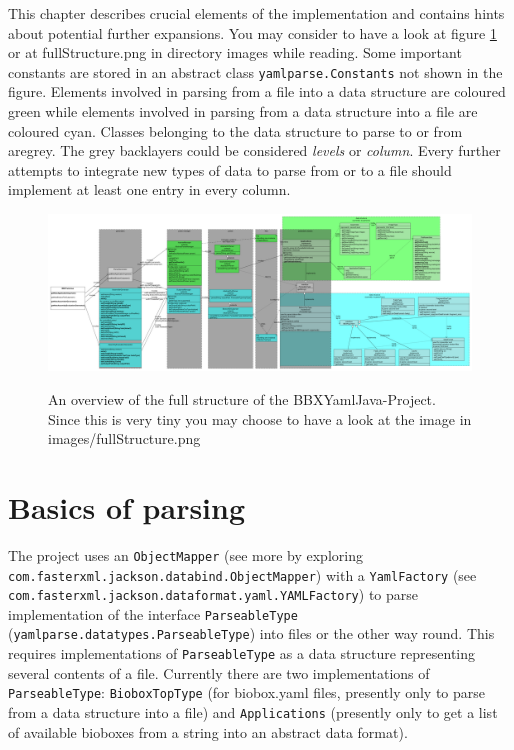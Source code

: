 \documentclass[
	twoside,
	fontsize=12pt,
	headsepline,
	cleardoublepage=empty,
	numbers=noenddot,
	bibliography=totoc,
]{scrbook}
\newcommand{\code}[1]{\texttt{#1}}
\begin{document}
This chapter describes crucial elements of the implementation and contains hints about potential further expansions. You may consider to have a look at figure \ref{fig:fullStructure} or at fullStructure.png in directory images while reading. Some important constants are stored in an abstract class \code{yamlparse.Constants} not shown in the figure. Elements involved in parsing from a file into a data structure are coloured green while elements involved in parsing from a data structure into a file are coloured cyan. Classes belonging to the data structure to parse to or from aregrey. The grey backlayers could be considered \emph{levels} or \emph{column}. Every further attempts to integrate new types of data to parse from or to a file should implement at least one entry in every column. 

\begin{figure}[h]
	\includegraphics[scale=0.18, angle=90]{images/fullStructure.png}
	\label{fig:fullStructure}
	\caption{An overview of the full structure of the BBXYamlJava-Project. Since this is very tiny you may choose to have a look at the image in images/fullStructure.png}
\end{figure}

\section{Basics of parsing}
\label{sec:basicParsing}
The project uses an \code{ObjectMapper} (see more by exploring\\ \code{com.fasterxml.jackson.databind.ObjectMapper}) with a \code{YamlFactory} (see  \code{com.fasterxml.jackson.dataformat.yaml.YAMLFactory}) to parse implementation of the interface \code{ParseableType} (\code{yamlparse.datatypes.ParseableType}) into files or the other way round. This requires implementations of \code{ParseableType} as  a data structure representing several contents of a file. Currently there are two implementations of \code{ParseableType}: \code{BioboxTopType} (for biobox.yaml files, presently only to parse from a data structure into a file) and \code{Applications} (presently only to get a list of available bioboxes from a string into an abstract data format).
\end{document}
